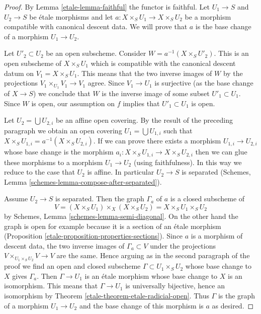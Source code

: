\begin{proof}

By Lemma \ref{etale-lemma-faithful} the functor is faithful.
Let $U_1 \to S$ and $U_2 \to S$ be \'etale morphisms
and let $a : X \times_S U_1 \to X \times_S U_2$ be a
morphism compatible with canonical descent data.
We will prove that $a$ is the base change of a morphism $U_1 \to U_2$.

\medskip\noindent
Let $U'_2 \subset U_2$ be an open subscheme. Consider
$W = a^{-1}(X \times_S U'_2)$. This is an open subscheme
of $X \times_S U_1$ which is compatible with the canonical
descent datum on $V_1 = X \times_S U_1$. This means that the
two inverse images of $W$ by the projections
$V_1 \times_{U_1} V_1 \to V_1$ agree. Since $V_1 \to U_1$
is surjective (as the base change of $X \to S$) we conclude
that $W$ is the inverse image of some subset $U'_1 \subset U_1$.
Since $W$ is open, our assumption on $f$ implies that $U'_1 \subset U_1$
is open.

\medskip\noindent
Let $U_2 = \bigcup U_{2, i}$ be an affine open covering.
By the result of the preceding paragraph we obtain an open
covering $U_1 = \bigcup U_{1, i}$ such that
$X \times_S U_{1, i} = a^{-1}(X \times_S U_{2, i})$.
If we can prove there exists a morphism $U_{1, i} \to U_{2, i}$
whose base change is the morphism
$a_i : X \times_S U_{1, i} \to X \times_S U_{2, i}$
then we can glue these morphisms to a morphism $U_1 \to U_2$
(using faithfulness). In this way we reduce to the case that
$U_2$ is affine. In particular $U_2 \to S$ is separated
(Schemes, Lemma \ref{schemes-lemma-compose-after-separated}).

\medskip\noindent
Assume $U_2 \to S$ is separated. Then the graph $\Gamma_a$ of $a$
is a closed subscheme of
$$
V = (X \times_S U_1) \times_X (X \times_S U_2) = X \times_S U_1 \times_S U_2
$$
by Schemes, Lemma \ref{schemes-lemma-semi-diagonal}.
On the other hand the graph is open for example
because it is a section of an \'etale morphism
(Proposition \ref{etale-proposition-properties-sections}).
Since $a$ is a morphism of descent data, the two inverse images of
$\Gamma_a \subset V$ under the projections
$V \times_{U_1 \times_S U_2} V \to V$ are the same.
Hence arguing as in the second paragraph of the proof we
find an open and closed subscheme $\Gamma \subset U_1 \times_S U_2$
whose base change to $X$ gives $\Gamma_a$. Then
$\Gamma \to U_1$ is an \'etale morphism whose base change
to $X$ is an isomorphism. This means that $\Gamma \to U_1$
is universally bijective, hence an isomorphism
by Theorem \ref{etale-theorem-etale-radicial-open}.
Thus $\Gamma$ is the graph of a morphism $U_1 \to U_2$
and the base change of this morphism is $a$ as desired.
\end{proof}

